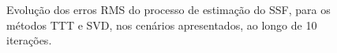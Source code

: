 \begin{figure}
    \vspace*{.5em}
    \caption{Evolução dos erros RMS do processo de estimação do SSF, para os métodos TTT e SVD, nos cenários apresentados, ao longo de 10 iterações.}
    \label{fig:appB:tt_ssf_rms_errors}
\end{figure}